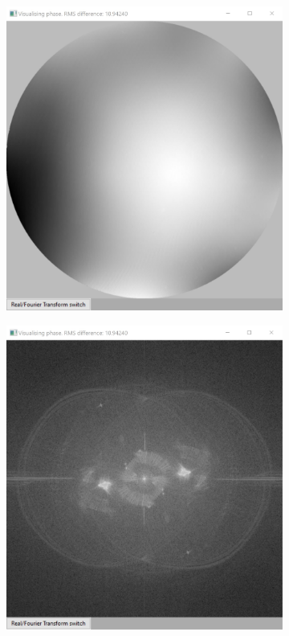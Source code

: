 \begin{figure}[h]
	\centering
	\begin{subfigure}{0.45\textwidth}
		\centering
		\includegraphics[width=1\linewidth, scale=0.5]{images/phase_viewer_phase.jpg}
		\caption{}
		\label{fig:phase_viewer_phase}
	\end{subfigure}
	\begin{subfigure}{0.45\textwidth}
		\centering
		\includegraphics[width=1\linewidth, scale=0.5]{images/phase_viewer_ft.jpg}

\end{subfigure}
\end{figure}
